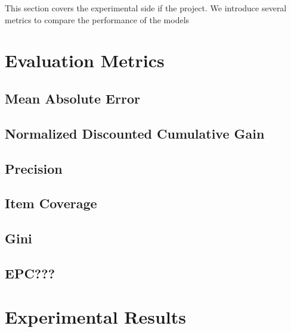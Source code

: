 This section covers the experimental side if the project. We introduce several metrics to compare the performance of the models

\section{Evaluation Metrics}

\subsection{Mean Absolute Error}

\subsection{Normalized Discounted Cumulative Gain}

\subsection{Precision}

\subsection{Item Coverage}

\subsection{Gini}

\subsection{EPC???}

\section{Experimental Results}
